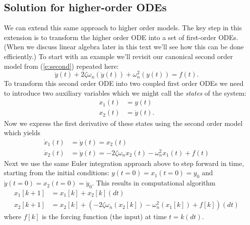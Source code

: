 \begin{soln}
\end{soln}
\fi


\subsection{Solution for higher-order ODEs}\label{ss:higher-order}
We can extend this same approach to higher order models.  The key step in this extension is to transform the higher order ODE into a set of first-order ODEs.  (When we discuss linear algebra later in this text we'll see how this can be done efficiently.)  To start with an example we'll revisit our canonical second order model from (\ref{e:second}) repeated here:
\begin{equation} 
\ddot{y}(t) + 2 \zeta \omega_n (\dot{y}(t)) + \omega_n^2 (y(t)) = f(t).
\end{equation} 
To transform this second order ODE into two coupled first order ODEs we need to introduce two auxiliary variables which we might call the \emph{states} of the system:
\begin{align}
x_1(t) & = y(t) \nonumber \\
x_2(t) & = \dot{y}(t).
\end{align}
Now we express the first derivative of these states using the second order model which yields
\begin{align}
\dot{x}_1(t) & = \dot{y}(t) = x_2(t) \nonumber \\
\dot{x}_2(t) & = \ddot{y}(t) = -2 \zeta \omega_n x_2(t) - \omega_n^2 x_1(t) + f(t) 
\end{align}
Next we use the same Euler integration approach above to step forward in time, starting from the initial conditions: $y(t=0)=x_1(t=0)=y_0$ and $\dot{y}(t=0)=x_2(t=0)=\dot{y}_0$.  This results in computational algorithm
\begin{align}\label{e:2nd-euler}
x_1[k+1] & = x_1[k] + x_2[k](dt) \nonumber \\
x_2[k+1] & = x_2[k] + \left(-2 \zeta \omega_n (x_2[k]) - \omega_n^2 (x_1[k]) + f[k]\right) (dt) 
\end{align}
where $f[k]$ is the forcing function (the input) at time $t=k(dt)$.

